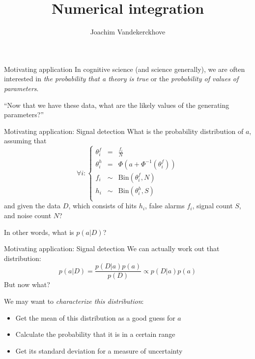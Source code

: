 \documentclass{beamer}
\author{Joachim Vandekerckhove}
\date{}
\begin{document}
\title{Numerical integration}
\begin{frame}
  \maketitle
\end{frame}

\begin{frame}{Motivating application}
In cognitive science (and science generally), we are often interested in \emph{the probability that a theory is true} or the \emph{probability of values of parameters}.\\[2ex]\pause

``Now that we have these data, what are the likely values of the generating parameters?''
\end{frame}


\begin{frame}[fragile]{Motivating application: Signal detection}
What is the probability distribution of $a$, assuming that
$$
\forall i: 
\left\{
\begin{array}{rcl}
\theta^f_i & = & \frac{f_i}{N}\\
\theta^h_i & = & \Phi\left(a + \Phi^{-1}\!\left(\theta^f_i\right)\right)\\
f_i &\sim& \text{Bin}\left(\theta^f_i, N\right)\\
h_i &\sim& \text{Bin}\left(\theta^h_i, S\right)\\
\end{array}
\right.
$$
and given the data $D$, which consists of hits $h_i$, false alarms $f_i$, signal count $S$, and noise count $N$?\\[2ex]\pause

In other words, what is $p\left(a | D\right)$?
\end{frame}

\begin{frame}{Motivating application: Signal detection}
We can actually work out that distribution:
$$
p\left(a | D\right) = \frac{p\left(D|a\right)p\left(a\right)}{p\left(D\right)} \propto p\left(D|a\right)p\left(a\right)
$$\pause
But now what?  \pause

We may want to \emph{characterize this distribution}\pause:
\begin{itemize}
\item Get the mean of this distribution as a good guess for $a$
\item Calculate the probability that it is in a certain range
\item Get its standard deviation for a measure of uncertainty
\end{itemize}
\end{frame}
\end{document}
